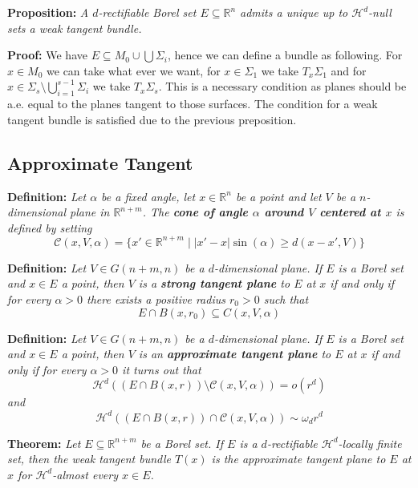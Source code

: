 \documentclass{article}
\begin{document}
\vspace{2ex}
\textbf{Proposition:} \textit{A $d$-rectifiable Borel set $E\subseteq\mathbb R^n$
admits a unique up to $\mathcal H^d$-null sets a weak tangent bundle.}

\vspace{1ex}
\textbf{Proof:} We have $E\subseteq M_0\cup\bigcup\Sigma_i$, hence we can define
a bundle as following. For $x\in M_0$ we can take what ever we want, for $x\in
\Sigma_1$ we take $T_x\Sigma_1$ and for $x\in \Sigma_s\setminus\bigcup_{i=1}^{s
-1}\Sigma_i$ we take $T_x\Sigma_s$. This is a necessary condition as planes
should be a.e. equal to the planes tangent to those surfaces. The condition for
a weak tangent bundle is satisfied due to the previous preposition.

\subsection{Approximate Tangent}

\textbf{Definition:} \textit{Let $\alpha$ be a fixed angle, let $x\in\mathbb R^n$
be a point and let $V$ be a $n$-dimensional plane in $\mathbb R^{n+m}$. The \textbf{
cone of angle $\alpha$ around $V$ centered at $x$} is defined by setting
\[\mathcal C(x,V,\alpha)=\{x'\in\mathbb R^{n+m}\;|\; |x′−x|\sin(\alpha)\geq d(x−x′, V)\}\]
}

\vspace{2ex}
\textbf{Definition:} \textit{Let $V\in G(n+m, n)$ be a $d$-dimensional plane.
If $E$ is a Borel set and $x\in E$ a point, then $V$ is a \textbf{strong tangent plane}
to $E$ at $x$ if and only if for every $\alpha >0$ there exists a positive
radius $r_0 >0$ such that
\[E∩B(x, r_0)\subseteq C(x, V, \alpha)\]
}

\vspace{2ex}
\textbf{Definition:} \textit{Let $V\in G(n+m, n)$ be a $d$-dimensional plane.
If $E$ is a Borel set and $x\in E$ a point, then $V$ is an \textbf{approximate tangent
plane} to $E$ at $x$ if and only if for every $\alpha>0$ it turns out that
\[\mathcal H^d((E∩B(x,r))\setminus\mathcal C(x, V, \alpha)) = o(r^d)\]
and
\[\mathcal H^d((E∩B(x, r))∩\mathcal C(x, V, α))\sim \omega_dr^d\]
}

\textbf{Theorem:} \textit{Let $E\subseteq\mathbb R^{n+m}$ be a Borel set. If $E$
is a $d$-rectifiable $\mathcal H^d$-locally finite set, then the weak tangent
bundle $T(x)$ is the approximate tangent plane to $E$ at $x$ for $\mathcal H^d$-almost
every $x\in E$.}
\end{document}
